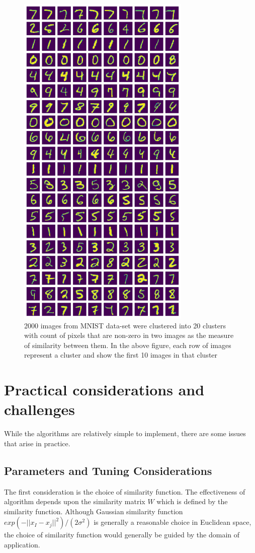 \documentclass[10pt,a4paper, nocenter]{report}
\newcommand{\norm}[1]{\lvert\lvert {#1} \rvert\rvert}
\begin{document}
\begin{enumerate}
\begin{figure}[h]
\begin{center}
            \includegraphics[height=6.5in]{../../number_clustering.png}
            \end{center}
            \caption{2000 images from MNIST data-set were clustered into 20 clusters with count of pixels that are non-zero in two images as the measure of similarity between them. In the above figure, each row of images represent a cluster and show the first 10 images in that cluster}
            \label{fig:mnistImages}
        \end{figure}
    \end{enumerate}
    
    
    \section{Practical considerations and challenges}

    While the algorithms are relatively simple to implement, there are some issues that arise in practice. 
    
    \subsection{Parameters and Tuning Considerations}
    The first consideration is the choice of similarity function. The effectiveness of algorithm depends upon the similarity matrix $W$ which is defined by the similarity function. Although Gaussian similarity function $exp(-\norm{x_I - x_j}^2)/(2\sigma^2)$ is generally a reasonable choice in Euclidean space, the choice of similarity function would generally be guided by the domain of application. 
\end{document}
